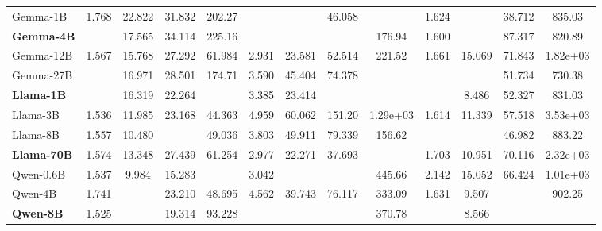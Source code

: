\begin{tabular}{l|cccc|cccc|cccc}
Gemma-1B & 1.768 & 22.822 & 31.832 & 202.27 & \cellcolor{green1}{2.922} & \cellcolor{green1}{18.663} & 46.058 & \cellcolor{green4}{109.70} & 1.624 & \cellcolor{green3}{8.404} & 38.712 & 835.03 \\
\textbf{Gemma-4B} & \cellcolor{green5}{1.425} & 17.565 & 34.114 & 225.16 & \cellcolor{green5}{2.667} & \cellcolor{green2}{15.437} & \cellcolor{green3}{26.018} & 176.94 & 1.600 & \cellcolor{green1}{8.453} & 87.317 & 820.89 \\
Gemma-12B & 1.567 & 15.768 & 27.292 & 61.984 & 2.931 & 23.581 & 52.514 & 221.52 & 1.661 & 15.069 & 71.843 & 1.82e+03 \\
Gemma-27B & \cellcolor{green2}{1.489} & 16.971 & 28.501 & 174.71 & 3.590 & 45.404 & 74.378 & \cellcolor{green2}{133.90} & \cellcolor{green4}{1.568} & \cellcolor{green2}{8.443} & 51.734 & 730.38 \\
\midrule

\textbf{Llama-1B} & \cellcolor{green1}{1.506} & 16.319 & 22.264 & \cellcolor{green1}{43.096} & 3.385 & 23.414 & \cellcolor{green1}{36.183} & \cellcolor{green5}{103.97} & \cellcolor{green2}{1.589} & 8.486 & 52.327 & 831.03 \\
Llama-3B & 1.536 & 11.985 & 23.168 & 44.363 & 4.959 & 60.062 & 151.20 & 1.29e+03 & 1.614 & 11.339 & 57.518 & 3.53e+03 \\
Llama-8B & 1.557 & 10.480 & \cellcolor{green1}{15.110} & 49.036 & 3.803 & 49.911 & 79.339 & 156.62 & \cellcolor{green1}{1.597} & \cellcolor{green4}{7.455} & 46.982 & 883.22 \\
\textbf{Llama-70B} & 1.574 & 13.348 & 27.439 & 61.254 & 2.977 & 22.271 & 37.693 & \cellcolor{green1}{144.73} & 1.703 & 10.951 & 70.116 & 2.32e+03 \\
\midrule

Qwen-0.6B & 1.537 & 9.984 & 15.283 & \cellcolor{green4}{29.145} & 3.042 & \cellcolor{green3}{14.474} & \cellcolor{green2}{32.679} & 445.66 & 2.142 & 15.052 & 66.424 & 1.01e+03 \\
Qwen-4B & 1.741 & \cellcolor{green4}{8.427} & 23.210 & 48.695 & 4.562 & 39.743 & 76.117 & 333.09 & 1.631 & 9.507 & \cellcolor{green2}{27.210} & 902.25 \\
\textbf{Qwen-8B} & 1.525 & \cellcolor{green5}{8.374} & 19.314 & 93.228 & \cellcolor{green2}{2.759} & \cellcolor{green5}{9.557} & \cellcolor{green5}{15.150} & 370.78 & \cellcolor{green3}{1.576} & 8.566 & \cellcolor{green3}{25.626} & \cellcolor{green1}{529.35} \\

\bottomrule
\end{tabular}